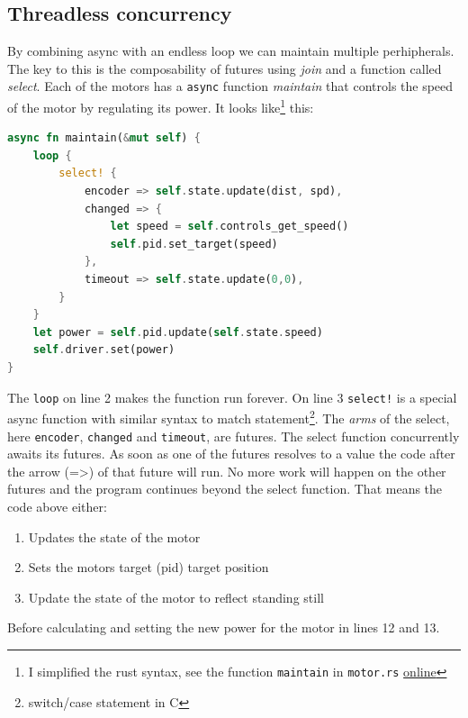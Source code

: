 \documentclass[lang=en, hanging-titles=true]{skrapport}
\begin{document}
\subsection{Threadless concurrency}
By combining async with an endless loop we can maintain multiple perhipherals. The key to this is the composability of futures using \textit{join} and a function called \textit{select}. Each of the motors has a \texttt{async} function \textit{maintain} that controls the speed of the motor by regulating its power. It looks like\footnote{I simplified the rust syntax, see the function \texttt{maintain} in \texttt{motor.rs} \href{https://github.com/dskleingeld/robotic-arm/blob/main/src/hinge/motor.rs}{online}} this:
%
\begin{minipage}{\linewidth} %
\begin{lstlisting}[language=rust, style=boxed, tabsize=2]
async fn maintain(&mut self) {
	loop {
		select! {
			encoder => self.state.update(dist, spd),
			changed => {
				let speed = self.controls_get_speed()
				self.pid.set_target(speed)
			},
			timeout => self.state.update(0,0),
		}
	}
	let power = self.pid.update(self.state.speed)
	self.driver.set(power)
}
\end{lstlisting}
\end{minipage}
%
The \texttt{loop} on line 2 makes the function run forever. On line 3 \texttt{select!} is a special async function with similar syntax to match statement\footnote{switch/case statement in C}. The \textit{arms} of the select, here \texttt{encoder}, \texttt{changed} and \texttt{timeout}, are futures. The select function concurrently awaits its futures. As soon as one of the futures resolves to a value the code after the arrow (=>) of that future will run. No more work will happen on the other futures and the program continues beyond the select function. That means the code above either:
\begin{enumerate}
	\item Updates the state of the motor
	\item Sets the motors target (pid) target position
	\item Update the state of the motor to reflect standing still
\end{enumerate}
Before calculating and setting the new power for the motor in lines 12 and 13.
\end{document}
